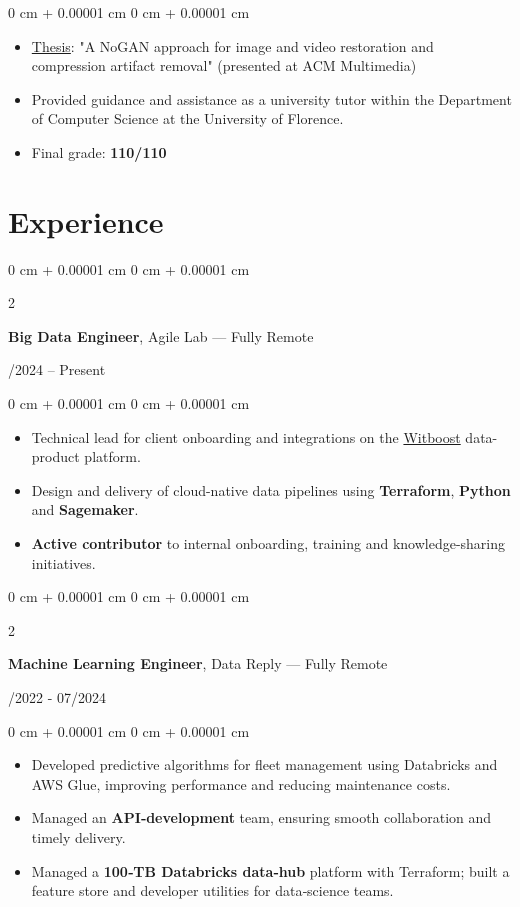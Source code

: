 \documentclass[10pt, letterpaper]{article}
\newenvironment{highlights}{
    \begin{itemize}[
        topsep=0.10 cm,
        parsep=0.10 cm,
        partopsep=0pt,
        itemsep=0pt,
        leftmargin=0 cm + 10pt
    ]
}{
    \end{itemize}
} %
\newenvironment{onecolentry}{
    \begin{adjustwidth}{
        0 cm + 0.00001 cm
    }{
        0 cm + 0.00001 cm
    }
}{
    \end{adjustwidth}
} %
\newenvironment{twocolentry}[2][]{
    \onecolentry
    \def\secondColumn{#2}
    \setcolumnwidth{\fill, 4.5 cm}
    \begin{paracol}{2}
}{
    \switchcolumn \raggedleft \secondColumn
    \end{paracol}
    \endonecolentry
} %
\let\hrefWithoutArrow\href
\begin{document}
\vspace{0.10 cm}
\begin{onecolentry}
    \begin{highlights}
        \item {\hrefWithoutArrow{https://ieeexplore.ieee.org/abstract/document/9413095}{Thesis}}: "A NoGAN approach for image and video restoration and compression artifact removal" (presented at ACM Multimedia)
        \item Provided guidance and assistance as a university tutor within the Department of Computer Science at the University of Florence.
        \item Final grade: \textbf{110/110}
    \end{highlights}
\end{onecolentry}

    \section{Experience}

\begin{twocolentry}{09/2024 – Present}
    \textbf{Big Data Engineer}, Agile Lab — Fully Remote
\end{twocolentry}
\begin{onecolentry}
    \begin{highlights}
        \item Technical lead for client onboarding and integrations on the {\hrefWithoutArrow{https://witboost.com/}{Witboost}} data-product platform.
        \item Design and delivery of cloud-native data pipelines using \textbf{Terraform}, \textbf{Python} and \textbf{Sagemaker}.
        \item \textbf{Active contributor} to internal onboarding, training and knowledge-sharing initiatives.
    \end{highlights}
\end{onecolentry}

\vspace{0.2 cm}

\begin{twocolentry}{05/2022 - 07/2024}
    \textbf{Machine Learning Engineer}, Data Reply — Fully Remote
\end{twocolentry}
\begin{onecolentry}
    \begin{highlights}
        \item Developed predictive algorithms for fleet management using Databricks and AWS Glue, improving performance and reducing maintenance costs.
        \item Managed an \textbf{API‑development} team, ensuring smooth collaboration and timely delivery.
        \item Managed a \textbf{100‑TB Databricks data‑hub} platform with Terraform; built a feature store and developer utilities for data‑science teams.
    \end{highlights}
\end{onecolentry}
\end{document}
